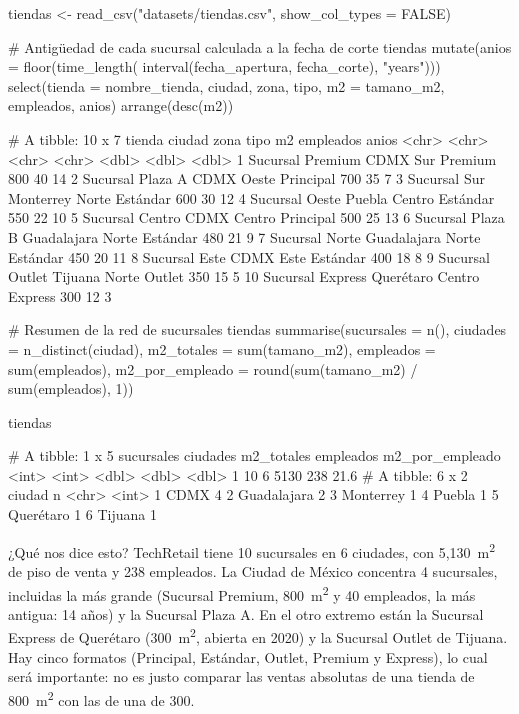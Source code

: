 \begin{rcode}
tiendas <- read_csv("datasets/tiendas.csv", show_col_types = FALSE)

# Antigüedad de cada sucursal calculada a la fecha de corte
tiendas %
  mutate(anios = floor(time_length(
           interval(fecha_apertura, fecha_corte), "years"))) %
  select(tienda = nombre_tienda, ciudad, zona, tipo,
         m2 = tamano_m2, empleados, anios) %
  arrange(desc(m2))
\end{rcode}

\begin{rsalida}
# A tibble: 10 x 7
   tienda           ciudad      zona   tipo         m2 empleados anios
   <chr>            <chr>       <chr>  <chr>     <dbl>     <dbl> <dbl>
 1 Sucursal Premium CDMX        Sur    Premium     800        40    14
 2 Sucursal Plaza A CDMX        Oeste  Principal   700        35     7
 3 Sucursal Sur     Monterrey   Norte  Estándar    600        30    12
 4 Sucursal Oeste   Puebla      Centro Estándar    550        22    10
 5 Sucursal Centro  CDMX        Centro Principal   500        25    13
 6 Sucursal Plaza B Guadalajara Norte  Estándar    480        21     9
 7 Sucursal Norte   Guadalajara Norte  Estándar    450        20    11
 8 Sucursal Este    CDMX        Este   Estándar    400        18     8
 9 Sucursal Outlet  Tijuana     Norte  Outlet      350        15     5
10 Sucursal Express Querétaro   Centro Express     300        12     3
\end{rsalida}

\begin{rcode}
# Resumen de la red de sucursales
tiendas %
  summarise(sucursales = n(),
            ciudades   = n_distinct(ciudad),
            m2_totales = sum(tamano_m2),
            empleados  = sum(empleados),
            m2_por_empleado = round(sum(tamano_m2) / sum(empleados), 1))

tiendas %
\end{rcode}

\begin{rsalida}
# A tibble: 1 x 5
  sucursales ciudades m2_totales empleados m2_por_empleado
       <int>    <int>      <dbl>     <dbl>           <dbl>
1         10        6       5130       238            21.6
# A tibble: 6 x 2
  ciudad          n
  <chr>       <int>
1 CDMX            4
2 Guadalajara     2
3 Monterrey       1
4 Puebla          1
5 Querétaro       1
6 Tijuana         1
\end{rsalida}

¿Qué nos dice esto? TechRetail tiene 10 sucursales en 6 ciudades, con
5,130~m\textsuperscript{2} de piso de venta y 238 empleados. La Ciudad de
México concentra 4 sucursales, incluidas la más grande (Sucursal Premium,
800~m\textsuperscript{2} y 40 empleados, la más antigua: 14 años) y la
Sucursal Plaza A. En el otro extremo están la Sucursal Express de Querétaro
(300~m\textsuperscript{2}, abierta en 2020) y la Sucursal Outlet de Tijuana.
Hay cinco formatos (Principal, Estándar, Outlet, Premium y Express), lo cual
será importante: no es justo comparar las ventas absolutas de una tienda de
800~m\textsuperscript{2} con las de una de 300.

